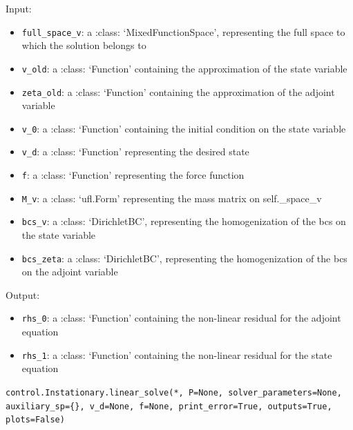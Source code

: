 \documentclass[letterpaper,10pt,english]{sphinxmanual}
\begin{document}
Input:
\begin{itemize}
\item \texttt{full{\_}space{\_}v}: a :class: `MixedFunctionSpace', representing the
            full space to which the solution belongs to

\item \texttt{v{\_}old}: a :class: `Function' containing the approximation of the
            state variable

\item \texttt{zeta{\_}old}: a :class: `Function' containing the approximation of
            the adjoint variable

\item \texttt{v{\_}0}: a :class: `Function' containing the initial condition on
            the state variable

\item \texttt{v{\_}d}: a :class: `Function' representing the desired state

\item \texttt{f}: a :class: `Function' representing the force function

\item \texttt{M{\_}v}: a :class: `ufl.Form' representing the mass matrix
            on self.\_space\_v

\item \texttt{bcs{\_}v}: a :class: `DirichletBC', representing the homogenization
            of the bcs on the state variable

\item \texttt{bcs{\_}zeta}: a :class: `DirichletBC', representing the homogenization
            of the bcs on the adjoint variable
\end{itemize}

Output:
\begin{itemize}
\item \texttt{rhs{\_}0}: a :class: `Function' containing the non-linear residual
                for the adjoint equation

\item \texttt{rhs{\_}1}: a :class: `Function' containing the non-linear residual
                for the state equation
\end{itemize}

\vspace{3ex}

\texttt{control.Instationary.linear{\_}solve(*, P=None, solver{\_}parameters=None, auxiliary{\_}sp=\{\}, v{\_}d=None, f=None, print{\_}error=True, outputs=True, plots=False)}
\end{document}
